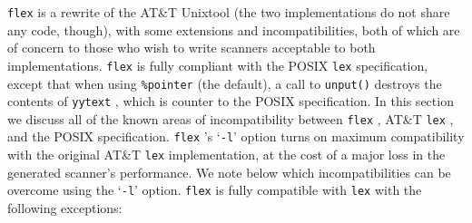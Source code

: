 \documentclass[openany,oneside]{book}
\begin{document}
 \verb`flex` is a rewrite of the AT\&{}T Unixtool (the two
implementations do not share any code, though), with some extensions and
incompatibilities, both of which are of concern to those who wish to
write scanners acceptable to both implementations. \verb`flex` is fully
compliant with the POSIX \verb`lex` specification, except that when
using \verb`%pointer` (the default), a call to \verb`unput()` destroys
the contents of \verb`yytext` , which is counter to the POSIX
specification.  In this section we discuss all of the known areas of
incompatibility between \verb`flex` , AT\&{}T \verb`lex` , and the POSIX
specification. \verb`flex` 's ‘\verb`-l`’ option turns on maximum
compatibility with the original AT\&{}T \verb`lex` implementation, at the
cost of a major loss in the generated scanner's performance.  We note
below which incompatibilities can be overcome using the ‘\verb`-l`’
option. \verb`flex` is fully compatible with \verb`lex` with the
following exceptions:
\end{document}
